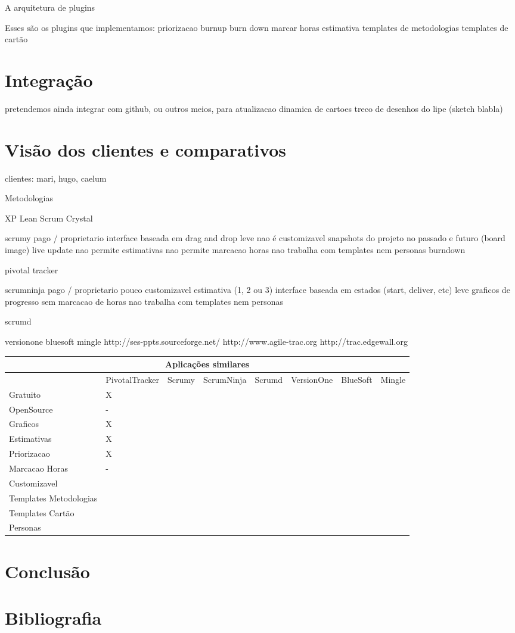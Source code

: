 \documentclass[titlepage,a4paper]{article}
\begin{document}
A arquitetura de plugins

Esses são os plugins que implementamos:
priorizacao
burnup
burn down
marcar horas
estimativa
templates de metodologias
templates de cartão

\section{Integração}
pretendemos ainda integrar com github, ou outros meios, para atualizacao dinamica de cartoes
treco de desenhos do lipe (sketch blabla)


\section{Visão dos clientes e comparativos}

clientes: mari, hugo, caelum

Metodologias

XP
Lean
Scrum
Crystal


scrumy
	pago / proprietario
	interface baseada em drag and drop
	leve
	nao é customizavel
	snapshots do projeto no passado e futuro (board image)
	live update
	nao permite estimativas
	nao permite marcacao horas
	nao trabalha com templates nem personas
	burndown
	
pivotal tracker

scrumninja
	pago / proprietario
	pouco customizavel
	estimativa (1, 2 ou 3)
	interface baseada em estados (start, deliver, etc)
	leve
	graficos de progresso
	sem marcacao de horas
	nao trabalha com templates nem personas

scrumd
	

versionone
bluesoft
mingle
http://ses-ppts.sourceforge.net/
http://www.agile-trac.org
http://trac.edgewall.org


\begin{sidewaystable}
	\begin{tabular}{|l|l|l|l|l|l|l|l}
		\hline
		\multicolumn{8}{|c|}{Aplicações similares} \\
		\hline
		 & PivotalTracker & Scrumy & ScrumNinja & Scrumd & VersionOne & BlueSoft & Mingle \\
		Gratuito & X & & & & & & \\
		OpenSource & - & & & & & & \\
		Graficos & X & & & & & & \\
		Estimativas & X & & & & & & \\
		Priorizacao & X & & & & & & \\
		Marcacao Horas & - & & & & & & \\
		Customizavel & & & & & & & \\
		Templates Metodologias & & & & & & & \\
		Templates Cartão & & & & & & & \\
		Personas & & & & & & & \\
		\hline
	\end{tabular}
\end{sidewaystable}

\section{Conclusão}

\section{Bibliografia}
\end{document}
